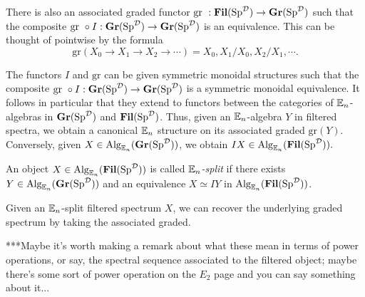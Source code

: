 There is also an associated graded functor $\text{gr }: \Fil(\Sp^{\D}) \to \Gr(\Sp^{\D})$ such that the composite $\text{gr }\circ I : \Gr(\Sp^{\D}) \to \Gr(\Sp^{\D})$ is an equivalence.   This can be thought of pointwise by the formula $$\text{gr}(X_0\to X_1\to X_2\to \cdots) = X_0, X_1/X_0, X_2/X_1, \cdots.$$




The functors $I$ and $\text{gr}$ can be given symmetric monoidal structures such that the composite $\text{gr }\circ I : \Gr(\Sp^{\D}) \to \Gr(\Sp^{\D})$ is a symmetric monoidal equivalence.  It follows in particular that they extend to functors between the categories of $\E_n$-algebras in $\Gr(\Sp^{\D})$ and $\Fil(\Sp^{\D})$.  Thus, given an $\E_n$-algebra $Y$ in filtered spectra, we obtain a canonical $\E_n$ structure on its associated graded $\text{gr}(Y).$  Conversely, given $X\in \Alg_{\E_n}(\Gr(\Sp^{\D}))$, we obtain $IX\in \Alg_{\E_n}(\Fil(\Sp^{\D})).$  

\begin{dfn}
An object $X\in \Alg_{\E_n}(\Fil(\Sp^{\D}))$ is called \emph{$\E_n$-split} if there exists $Y\in \Alg_{\E_n}(\Gr(\Sp^{\D}))$ and an equivalence $X \simeq IY$ in $\Alg_{\E_n}(\Fil(\Sp^{\D}))$.  
\end{dfn}

Given an $\E_n$-split filtered spectrum $X$, we can recover the underlying graded spectrum by taking the associated graded. 

***Maybe it's worth making a remark about what these mean in terms of power operations, or say, the spectral sequence associated to the filtered object; maybe there's some sort of power operation on the $E_2$ page and you can say something about it...

